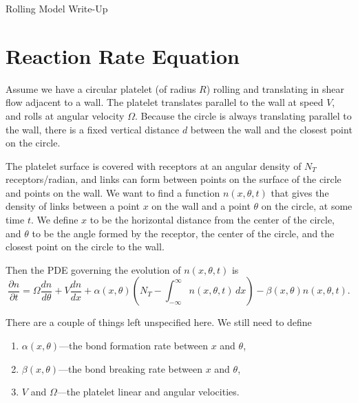 \documentclass{article}
\newcommand{\dd}{d}
\newcommand{\Der}[2]{\frac{\dd #1}{\dd #2}}
\newcommand{\Pder}[2]{\frac{\partial #1}{\partial #2}}
\newcommand{\Int}[4]{\int_{#3}^{#4} #1 \, \dd #2}
\begin{document}
\pagestyle{empty}


\begin{center}
{\Large Rolling Model Write-Up}
\end{center}

\section{Reaction Rate Equation}
\label{sec:reaction-rate-equation}

Assume we have a circular platelet (of radius $R$) rolling and
translating in shear flow adjacent to a wall. The platelet translates
parallel to the wall at speed $V$, and rolls at angular velocity
$\Omega$. Because the circle is always translating parallel to the
wall, there is a fixed vertical distance $d$ between the wall and the
closest point on the circle. 

The platelet surface is covered with receptors at an angular density
of $N_T$ receptors/radian, and links can form between points on the
surface of the circle and points on the wall. We want to find a
function $n(x, \theta, t)$ that gives the density of links between a
point $x$ on the wall and a point $\theta$ on the circle, at some time
$t$. We define $x$ to be the horizontal distance from the center of
the circle, and $\theta$ to be the angle formed by the receptor, the
center of the circle, and the closest point on the circle to the wall.

Then the PDE governing the evolution of $n(x, \theta, t)$ is 
\begin{equation}
  \label{eq:master}
  \Pder{n}{t} = \Omega \Der{n}{\theta} + V \Der{n}{x} + \alpha(x,
  \theta) \left(N_T - \Int{n(x,\theta,t)}{x}{-\infty}{\infty}\right) - 
  \beta(x, \theta) n(x,\theta,t).
\end{equation}

There are a couple of things left unspecified here. We still need to
define
\begin{enumerate}
\item $\alpha(x, \theta)$---the bond formation rate between $x$ and
  $\theta$, \label{item:form-rate}
\item $\beta(x, \theta)$---the bond breaking rate between $x$ and
  $\theta$, \label{item:break-rate}
\item $V$ and $\Omega$---the platelet linear and angular
  velocities. \label{item:velocities} 
\end{enumerate}
\end{document}
